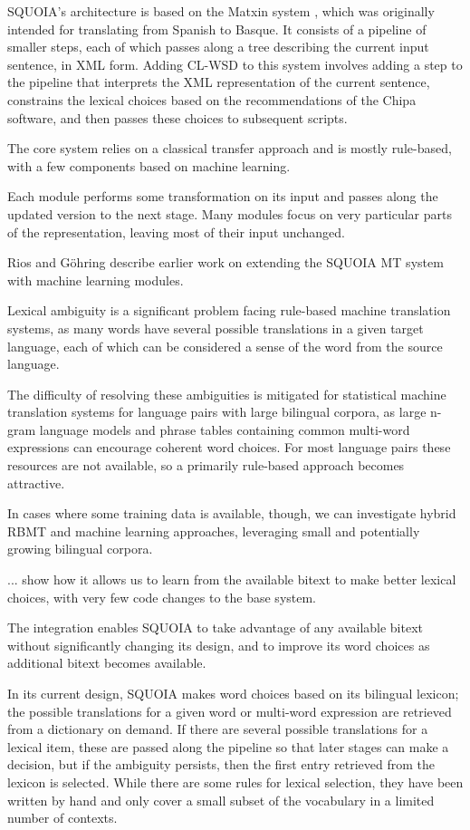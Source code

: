 SQUOIA's architecture is based on the Matxin system \cite{matxin2005}, which
was originally intended for translating from Spanish to Basque.
It consists of a pipeline of smaller steps, each of which passes along a tree
describing the current input sentence, in XML form. Adding CL-WSD to this
system involves adding a step to the pipeline that interprets the XML
representation of the current sentence, constrains the lexical choices based on
the recommendations of the Chipa software, and then passes these choices to
subsequent scripts.

The core system relies on a classical transfer approach and is mostly
rule-based, with a few components based on machine learning.

Each module performs some transformation on its input and
passes along the updated version to the next stage. Many modules focus on very
particular parts of the representation, leaving most of their input unchanged.

Rios and G\"{o}hring \cite{riosgonzales-gohring:2013:HyTra} describe
earlier work on extending the SQUOIA MT system with machine learning modules.

Lexical ambiguity is a significant problem facing rule-based machine
translation systems, as many words have several possible translations in a
given target language, each of which can be considered a sense of the word from
the source language.

The difficulty of resolving these ambiguities is mitigated for 
statistical machine translation systems for language pairs with large bilingual
corpora, as large n-gram language models and phrase tables containing common
multi-word expressions can encourage coherent word choices.
For most language pairs these resources are not available, so a primarily
rule-based approach becomes attractive.

In cases where some training data is available, though, we can
investigate hybrid RBMT and machine learning approaches, leveraging small and
potentially growing bilingual corpora.

... show how it allows us to learn from the available bitext to
make better lexical choices, with very few code changes to the base system.

The integration enables SQUOIA to take advantage of any available bitext
without significantly changing its design, and to improve its word choices as
additional bitext becomes available.

In its current design, SQUOIA makes word choices based on its bilingual
lexicon; the possible translations for a given word or multi-word expression
are retrieved from a dictionary on demand. If there are several possible
translations for a lexical item, these are passed along the pipeline so
that later stages can make a decision, but if the ambiguity persists,
then the first entry retrieved from the lexicon is selected. While there are
some rules for lexical selection, they have been written by hand and only cover
a small subset of the vocabulary in a limited number of contexts.

